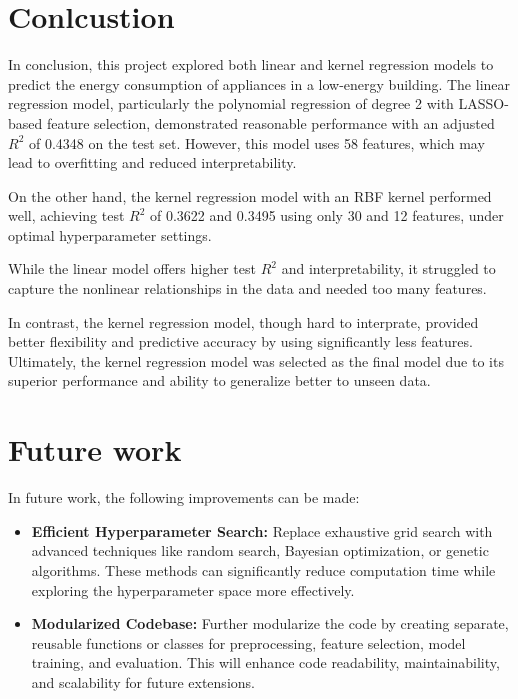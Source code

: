 \documentclass[12pt]{article}
\begin{document}
\section{Conlcustion}
In conclusion, this project explored both linear and kernel regression
 models to predict the energy consumption of appliances in a low-energy building. 
The linear regression model, particularly the polynomial regression of degree 2 with LASSO-based feature selection,
demonstrated reasonable performance with an adjusted $R^2$ of 0.4348 on the test set. 
However, this model uses 58 features, which may lead to overfitting and reduced interpretability.


On the other hand, the kernel regression model with an RBF kernel performed well, 
achieving test $R^2$ of 0.3622 and 0.3495 using only 30 and 12 features, under optimal hyperparameter settings.

While the linear model offers higher test $R^2$ and interpretability,
it struggled to capture the nonlinear relationships in the data and needed too many features.

In contrast,
the kernel regression model, though hard to interprate, provided better flexibility
and predictive accuracy by using significantly less features.
Ultimately, the kernel regression model was selected as the final
model due to its superior performance and ability to generalize better to unseen data.

\section{Future work}
In future work, the following improvements can be made:

\begin{itemize}
    \item \textbf{Efficient Hyperparameter Search:} 
    Replace exhaustive grid search with advanced techniques like random search,
     Bayesian optimization, or genetic algorithms. These methods can significantly 
     reduce computation time while exploring the hyperparameter space more effectively.

    \item \textbf{Modularized Codebase:} 
    Further modularize the code by creating separate, reusable functions or
     classes for preprocessing, feature selection, model training, and evaluation.
      This will enhance code readability, maintainability, and scalability for future extensions.
\end{itemize}
\end{document}
